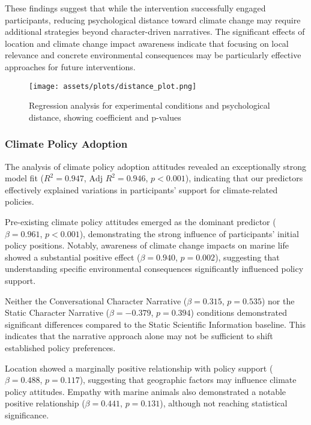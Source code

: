 \documentclass[sigconf, nonacm]{acmart}
\begin{document}
These findings suggest that while the intervention successfully engaged participants, reducing psychological distance toward climate change may require additional strategies beyond character-driven narratives. The significant effects of location and climate change impact awareness indicate that focusing on local relevance and concrete environmental consequences may be particularly effective approaches for future interventions.

\begin{figure}
    \centering
    \texttt{[image: assets/plots/distance\_plot.png]}
    \caption{Regression analysis for experimental conditions and psychological distance, showing coefficient and p-values}
    \label{fig:distance_post}
\end{figure}

\subsubsection{Climate Policy Adoption}

The analysis of climate policy adoption attitudes revealed an exceptionally strong model fit ($R^2 = 0.947$, $\text{Adj } R^2 = 0.946$, $p < 0.001$), indicating that our predictors effectively explained variations in participants' support for climate-related policies.

Pre-existing climate policy attitudes emerged as the dominant predictor ($\beta = 0.961$, $p < 0.001$), demonstrating the strong influence of participants' initial policy positions. Notably, awareness of climate change impacts on marine life showed a substantial positive effect ($\beta = 0.940$, $p = 0.002$), suggesting that understanding specific environmental consequences significantly influenced policy support.

Neither the Conversational Character Narrative ($\beta = 0.315$, $p = 0.535$) nor the Static Character Narrative ($\beta = -0.379$, $p = 0.394$) conditions demonstrated significant differences compared to the Static Scientific Information baseline. This indicates that the narrative approach alone may not be sufficient to shift established policy preferences.

Location showed a marginally positive relationship with policy support ($\beta = 0.488$, $p = 0.117$), suggesting that geographic factors may influence climate policy attitudes. Empathy with marine animals also demonstrated a notable positive relationship ($\beta = 0.441$, $p = 0.131$), although not reaching statistical significance.
\end{document}
